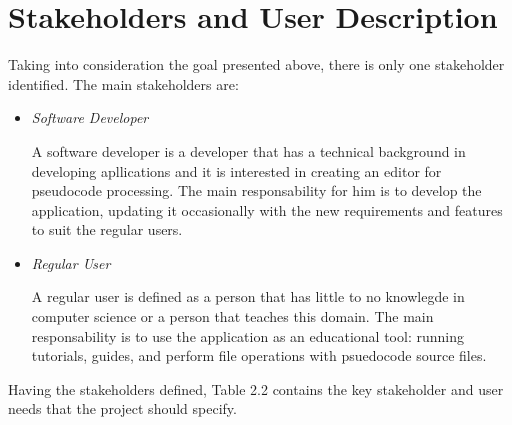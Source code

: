 \documentclass[12pt,a4paper,twoside]{report}
\begin{document}
\section{Stakeholders and User Description}

Taking into consideration the goal presented above, there is only one stakeholder identified. The main stakeholders are:
\begin{itemize}
\item \textit{Software Developer}
	
	A software developer is a developer that has a technical background in developing apllications and it is interested in creating an editor for pseudocode processing. The main responsability for him is to develop the application, updating it occasionally with the new requirements and features to suit the regular users.
	 
\item \textit{Regular User}

A regular user is defined as a person that has little to no knowlegde in computer science or a person that teaches this domain. The main responsability is to use the application as an educational tool: running tutorials, guides, and perform file operations with psuedocode source files.
\end{itemize} 

Having the stakeholders defined, Table 2.2 contains the key stakeholder and user needs that the project should specify.
\begin{table}[H]
\centering
{}
\caption{Key Stakeholder and User Needs}
\label{tab:my-table}
\end{table}
\end{document}
